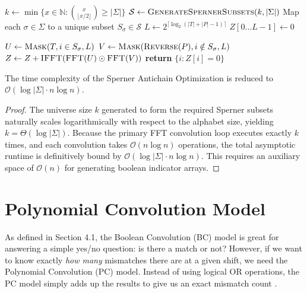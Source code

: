 \begin{algorithm}[H]
\caption{Sperner Antichain Optimization (Muthukrishnan-Palem)}
\begin{algorithmic}[1]
    \State $k \gets \min \{ x \in \mathbb{N} \colon \binom{x}{\lfloor x/2 \rfloor} \ge |\Sigma| \}$
    \State $\mathcal{S} \gets \text{\textsc{GenerateSpernerSubsets}}(k, |\Sigma|)$
    \State Map each $\sigma \in \Sigma$ to a unique subset $S_\sigma \in \mathcal{S}$
    \State $L \gets 2^{\lceil \log_2(|T| + |P| - 1) \rceil}$
    \State $Z[0 \dots L-1] \gets 0$
    
        \State $U \gets \text{\textsc{Mask}}(T, i \in S_\sigma, L)$
        \State $V \gets \text{\textsc{Mask}}(\text{\textsc{Reverse}}(P), i \notin S_\sigma, L)$
        \State $Z \gets Z + \text{\textsc{IFFT}}(\text{\textsc{FFT}}(U) \odot \text{\textsc{FFT}}(V))$
    \EndFor
    \State \textbf{return} $\{i \colon Z[i] = 0\}$
\EndFunction
\end{algorithmic}
\end{algorithm}

\begin{theorem}
The time complexity of the Sperner Antichain Optimization is reduced to $\mathcal{O}(\log |\Sigma| \cdot n \log n)$.
\end{theorem}
\begin{proof}
The universe size $k$ generated to form the required Sperner subsets naturally scales logarithmically with respect to the alphabet size, yielding $k = \Theta(\log |\Sigma|)$. Because the primary FFT convolution loop executes exactly $k$ times, and each convolution takes $\mathcal{O}(n \log n)$ operations, the total asymptotic runtime is definitively bound by $\mathcal{O}(\log |\Sigma| \cdot n \log n)$. This requires an auxiliary space of $\mathcal{O}(n)$ for generating boolean indicator arrays.
\end{proof}

\section{Polynomial Convolution Model}
As defined in Section 4.1, the Boolean Convolution (BC) model is great for answering a simple yes/no question: is there a match or not? However, if we want to know exactly \textit{how many} mismatches there are at a given shift, we need the Polynomial Convolution (PC) model. Instead of using logical OR operations, the PC model simply adds up the results to give us an exact mismatch count \cite{mp1994}.

